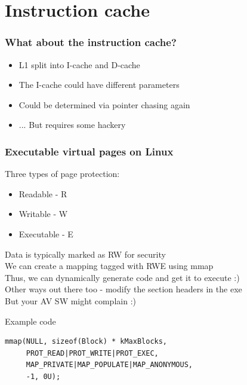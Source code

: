 \documentclass{beamer}
\begin{document}
\section{Instruction cache}

\begin{frame}
\frametitle{What about the instruction cache?}
\begin{itemize}
\item L1 split into I-cache and D-cache 
\item The I-cache could have different parameters
\item Could be determined via pointer chasing again
\item ... But requires some hackery
\end{itemize}
\end{frame}

\begin{frame}[fragile]
\frametitle{Executable virtual pages on Linux}
Three types of page protection:\\
\begin{itemize}
\item Readable - R
\item Writable - W
\item Executable - E
\end{itemize}
Data is typically marked as RW for security\\
We can create a mapping tagged with RWE using mmap\\
Thus, we can dynamically generate code and get it to execute :)\\
Other ways out there too - modify the section headers in the exe\\
But your AV SW might complain :)

\begin{block}{Example code}
\begin{lstlisting}[style=code]
mmap(NULL, sizeof(Block) * kMaxBlocks,
     PROT_READ|PROT_WRITE|PROT_EXEC,
     MAP_PRIVATE|MAP_POPULATE|MAP_ANONYMOUS,
     -1, 0U);
\end{lstlisting}
\end{block}
\end{frame}
\end{document}

